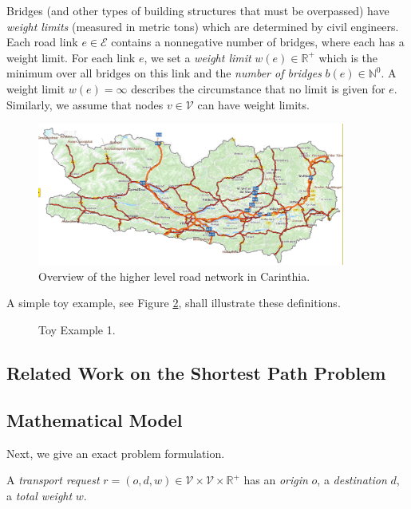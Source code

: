 Bridges (and other types of building structures that must be overpassed)
have \emph{weight limits} (measured in metric tons) which are determined by civil engineers.
Each road link $e \in \mathcal{E}$ contains a nonnegative number of bridges, where each has a weight limit.
For each link $e$, we set a \emph{weight limit} $w(e) \in \mathbb{R}^{+}$ which is the
minimum over all bridges on this link and the \emph{number of bridges} $b(e) \in \mathbb{N}^{0}$.
A weight limit $w(e)= \infty$ describes the circumstance
that no limit is given for $e$.
Similarly, we assume that nodes $v \in \mathcal{V}$ can have weight limits.
\begin{figure}[!ht]
 \centering
  \includegraphics[width=0.9\textwidth]{map.jpg}
  \caption{Overview of the higher level road network in Carinthia.}
  \label{fig:higher level}
\end{figure}


A simple toy example, see Figure \ref{fig_toy_example_1}, shall illustrate these definitions.
\begin{figure}[!ht]
  \centering
  
  \caption{Toy Example 1.}
  \label{fig_toy_example_1}
\end{figure}


\subsection{Related Work on the Shortest Path Problem}

\citet{TACCARI2016122}

\subsection{Mathematical Model}

Next, we give an exact problem formulation.

A \emph{transport request} $r=(o,d,w) \in \mathcal{V} \times \mathcal{V} \times \mathbb{R}^{+}$
has an \emph{origin} $o$, a \emph{destination} $d$, a \emph{total weight} $w$.

